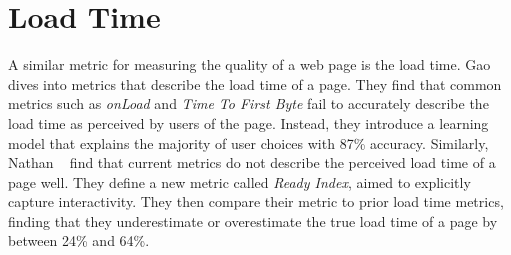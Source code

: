 \section{Load Time}\label{sec:related-work:load-time}
A similar metric for measuring the quality of a web page is the load time. Gao \etal{}~\cite{gao2017perceived} dives into metrics that describe the load time of a page. They find that common metrics such as \emph{onLoad} and \emph{Time To First Byte} fail to accurately describe the load time as perceived by users of the page. Instead, they introduce a learning model that explains the majority of user choices with 87\% accuracy. 
Similarly, Nathan \etal{}~\cite{nathan2018measuring} find that current metrics do not describe the perceived load time of a page well. They define a new metric called \emph{Ready Index}, aimed to explicitly capture interactivity. They then compare their metric to prior load time metrics, finding that they underestimate or overestimate the true load time of a page by between 24\% and 64\%. 